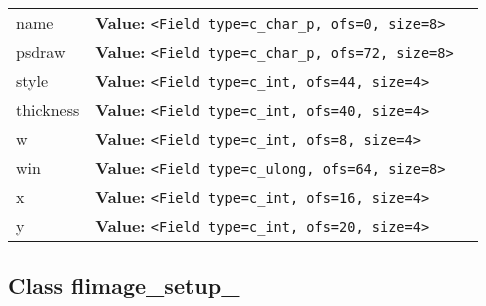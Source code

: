 \begin{longtable}{|p{\varnamewidth}|p{\vardescrwidth}|l}
\cline{1-2}
\raggedright n\-a\-m\-e\- & \raggedright \textbf{Value:} 
{\tt {\textless}Field type=c\_char\_p, ofs=0, size=8{\textgreater}}&\\
\cline{1-2}
\raggedright p\-s\-d\-r\-a\-w\- & \raggedright \textbf{Value:} 
{\tt {\textless}Field type=c\_char\_p, ofs=72, size=8{\textgreater}}&\\
\cline{1-2}
\raggedright s\-t\-y\-l\-e\- & \raggedright \textbf{Value:} 
{\tt {\textless}Field type=c\_int, ofs=44, size=4{\textgreater}}&\\
\cline{1-2}
\raggedright t\-h\-i\-c\-k\-n\-e\-s\-s\- & \raggedright \textbf{Value:} 
{\tt {\textless}Field type=c\_int, ofs=40, size=4{\textgreater}}&\\
\cline{1-2}
\raggedright w\- & \raggedright \textbf{Value:} 
{\tt {\textless}Field type=c\_int, ofs=8, size=4{\textgreater}}&\\
\cline{1-2}
\raggedright w\-i\-n\- & \raggedright \textbf{Value:} 
{\tt {\textless}Field type=c\_ulong, ofs=64, size=8{\textgreater}}&\\
\cline{1-2}
\raggedright x\- & \raggedright \textbf{Value:} 
{\tt {\textless}Field type=c\_int, ofs=16, size=4{\textgreater}}&\\
\cline{1-2}
\raggedright y\- & \raggedright \textbf{Value:} 
{\tt {\textless}Field type=c\_int, ofs=20, size=4{\textgreater}}&\\
\cline{1-2}
\end{longtable}



\subsection{Class flimage\_setup\_}

